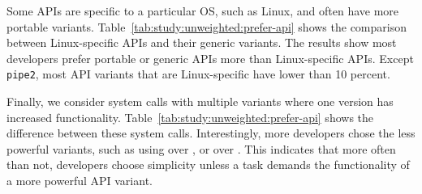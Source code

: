 Some APIs are specific to a particular OS,
such as Linux,
and often have more portable variants.
Table~\ref{tab:study:unweighted:prefer-api} shows the comparison between
Linux-specific APIs and their generic variants.
The results show most developers prefer portable or generic APIs
more than Linux-specific APIs.
Except {\tt pipe2}, most API variants that are Linux-specific
have \unwusagemetric{} lower than 10 percent.

Finally, we consider system calls with multiple variants
where one version has increased functionality.
Table~\ref{tab:study:unweighted:prefer-api} shows the difference %
between these system calls.
Interestingly, more developers chose the less powerful variants,
such as using  over , or  over .
This indicates that more often than not, developers choose simplicity 
unless a task demands the functionality of a more powerful API variant.


